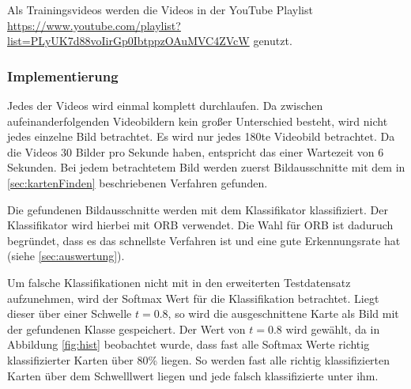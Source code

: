 Als Trainingsvideos werden die Videos in der YouTube Playlist \url{https://www.youtube.com/playlist?list=PLyUK7d88voIirGp0IbtppzOAuMVC4ZVcW} genutzt.

\subsubsection{Implementierung}

Jedes der Videos wird einmal komplett durchlaufen. Da zwischen aufeinanderfolgenden Videobildern kein großer Unterschied besteht, wird nicht jedes einzelne Bild betrachtet.
Es wird nur jedes 180te Videobild betrachtet. Da die Videos 30 Bilder pro Sekunde haben, entspricht das einer Wartezeit von 6 Sekunden.
Bei jedem betrachtetem Bild werden zuerst Bildausschnitte mit dem in \ref{sec:kartenFinden} beschriebenen Verfahren gefunden. 

Die gefundenen Bildausschnitte werden mit dem Klassifikator klassifiziert.
Der Klassifikator wird hierbei mit ORB verwendet. Die Wahl für ORB ist daduruch begründet, dass es das schnellste Verfahren ist und eine gute Erkennungsrate hat (siehe \ref{sec:auswertung}).

Um falsche Klassifikationen nicht mit in den erweiterten Testdatensatz aufzunehmen, wird der Softmax Wert für die Klassifikation betrachtet. Liegt dieser über einer Schwelle $t = 0.8$, so wird die ausgeschnittene Karte als Bild mit der gefundenen Klasse gespeichert. Der Wert von $t = 0.8$ wird gewählt, da in Abbildung \ref{fig:hist} beobachtet wurde, dass fast alle Softmax Werte richtig klassifizierter Karten über 80\% liegen. So werden fast alle richtig klassifizierten Karten über dem Schwelllwert liegen und jede falsch klassifizierte unter ihm.
